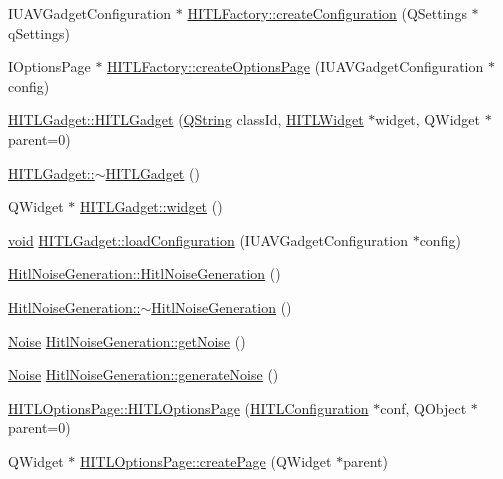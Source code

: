 \begin{DoxyCompactItemize}
\item 
\-I\-U\-A\-V\-Gadget\-Configuration $\ast$ \hyperlink{group___h_i_t_l_plugin_ga68fed3efae6281089db53d6ea596e331}{\-H\-I\-T\-L\-Factory\-::create\-Configuration} (\-Q\-Settings $\ast$q\-Settings)
\item 
\-I\-Options\-Page $\ast$ \hyperlink{group___h_i_t_l_plugin_ga3064ddee76385734787a3a04e203bac2}{\-H\-I\-T\-L\-Factory\-::create\-Options\-Page} (\-I\-U\-A\-V\-Gadget\-Configuration $\ast$config)
\item 
\hyperlink{group___h_i_t_l_plugin_ga2d1233acc508f6fcd25061c0584d1bab}{\-H\-I\-T\-L\-Gadget\-::\-H\-I\-T\-L\-Gadget} (\hyperlink{group___u_a_v_objects_plugin_gab9d252f49c333c94a72f97ce3105a32d}{\-Q\-String} class\-Id, \hyperlink{class_h_i_t_l_widget}{\-H\-I\-T\-L\-Widget} $\ast$widget, \-Q\-Widget $\ast$parent=0)
\item 
\hyperlink{group___h_i_t_l_plugin_ga92376558188a3a1fdff609f2641758e7}{\-H\-I\-T\-L\-Gadget\-::$\sim$\-H\-I\-T\-L\-Gadget} ()
\item 
\-Q\-Widget $\ast$ \hyperlink{group___h_i_t_l_plugin_ga98f16ca8c766c1cd037af671c7f843be}{\-H\-I\-T\-L\-Gadget\-::widget} ()
\item 
\hyperlink{group___u_a_v_objects_plugin_ga444cf2ff3f0ecbe028adce838d373f5c}{void} \hyperlink{group___h_i_t_l_plugin_gad490d49033c38f3e197628890c342634}{\-H\-I\-T\-L\-Gadget\-::load\-Configuration} (\-I\-U\-A\-V\-Gadget\-Configuration $\ast$config)
\item 
\hyperlink{group___h_i_t_l_plugin_ga1dab19a6599c296ffb839d1449789da2}{\-Hitl\-Noise\-Generation\-::\-Hitl\-Noise\-Generation} ()
\item 
\hyperlink{group___h_i_t_l_plugin_ga86eb1b28193cc2594ee5bd38658eb06a}{\-Hitl\-Noise\-Generation\-::$\sim$\-Hitl\-Noise\-Generation} ()
\item 
\hyperlink{struct_noise}{\-Noise} \hyperlink{group___h_i_t_l_plugin_ga48da3a2284408957fb754e0e4488ab16}{\-Hitl\-Noise\-Generation\-::get\-Noise} ()
\item 
\hyperlink{struct_noise}{\-Noise} \hyperlink{group___h_i_t_l_plugin_ga1492fee962eb0c1d6b48d8a4167d6d67}{\-Hitl\-Noise\-Generation\-::generate\-Noise} ()
\item 
\hyperlink{group___h_i_t_l_plugin_ga6f316a1c3e3ee76ad5d8931dbc861194}{\-H\-I\-T\-L\-Options\-Page\-::\-H\-I\-T\-L\-Options\-Page} (\hyperlink{class_h_i_t_l_configuration}{\-H\-I\-T\-L\-Configuration} $\ast$conf, \-Q\-Object $\ast$parent=0)
\item 
\-Q\-Widget $\ast$ \hyperlink{group___h_i_t_l_plugin_ga82b1534b1cdc2ad63d8849636f64b8c9}{\-H\-I\-T\-L\-Options\-Page\-::create\-Page} (\-Q\-Widget $\ast$parent)

\end{DoxyCompactItemize}
